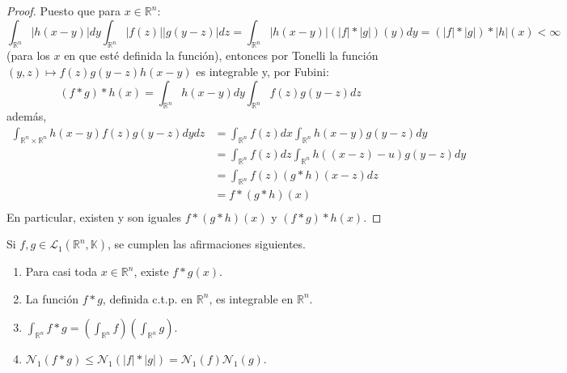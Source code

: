 \documentclass[12pt]{report}
\theoremstyle{largebreak}
\newcommand\abs[1]{\ensuremath{\big|#1\big|}}
\newcommand{\N}[2]{\ensuremath{\mathcal{N}_{#1}\left(#2\right)}}
\begin{document}
\begin{proof}
        Puesto que para $x\in\mathbb{R}^n$:
        \begin{equation*}
            \int_{ \mathbb{R}^n}\abs{h(x-y)}dy\int_{\mathbb{R}^n}\abs{f(z)}\abs{g(y-z)}dz=\int_{\mathbb{R}^n}\abs{h(x-y)}(\abs{f}*\abs{g})(y)dy=(\abs{f}*\abs{g})*\abs{h}(x)<\infty
        \end{equation*}
        (para los $x$ en que esté definida la función), entonces por Tonelli la función $(y,z)\mapsto f(z)g(y-z)h(x-y)$ es integrable y, por Fubini:
        \begin{equation*}
            (f*g)*h(x)=\int_{ \mathbb{R}^n}h(x-y)dy\int_{\mathbb{R}^n}f(z)g(y-z)dz
        \end{equation*}
        además,
        \begin{equation*}
            \begin{split}
                \int_{ \mathbb{R}^n\times \mathbb{R}^n}h(x-y)f(z)g(y-z)dydz&=\int_{ \mathbb{R}^n}f(z)dx\int_{ \mathbb{R}^n}h(x-y)g(y-z)dy\\
                &=\int_{ \mathbb{R}^n}f(z)dz\int_{ \mathbb{R}^n}h((x-z)-u)g(y-z)dy\\
                &=\int_{ \mathbb{R}^n}f(z)(g*h)(x-z)dz\\
                &=f*(g*h)(x)\\
            \end{split}
        \end{equation*}
        En particular, existen y son iguales $f*(g*h)(x)$ y $(f*g)*h(x)$.
    \end{proof}

    \begin{theor}
        Si $f,g\in\mathcal{L}_1(\mathbb{R}^n,\mathbb{K})$, se cumplen las afirmaciones siguientes.
        \begin{enumerate}
            \item Para casi toda $x\in\mathbb{R}^n$, existe $f*g(x)$.
            \item La función $f*g$, definida c.t.p. en $\mathbb{R}^n$, es integrable en $\mathbb{R}^n$.
            \item $\int_{ \mathbb{R}^n}f*g=\left(\int_{ \mathbb{R}^n}f\right)\left(\int_{ \mathbb{R}^n}g\right)$.
            \item $\N{1}{f*g}\leq\N{1}{\abs{f}*\abs{g}}=\N{1}{f}\N{1}{g}$.
        \end{enumerate}
    \end{theor}
\end{document}
